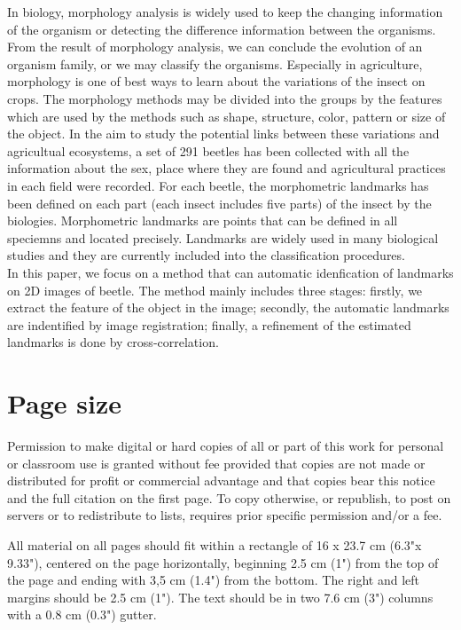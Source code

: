 \documentclass[twoside,twocolumn,10pt]{article}
\begin{document}
In biology, morphology analysis is widely used to keep the changing information of the organism or detecting the difference information between the organisms. From the result of morphology analysis, we can conclude the evolution of an organism family, or we may classify the organisms. Especially in agriculture, morphology is one of best ways to learn about the variations of the insect on crops. The morphology methods may be divided into the groups by the features which are used by the methods such as shape, structure, color, pattern or size of the object. In the aim to study the potential links between these variations and agricultual ecosystems, a set of 291 beetles has been collected with all the information about the sex, place where they are found and agricultural practices in each field were recorded. For each beetle, the morphometric landmarks has been defined on each part (each insect includes five parts) of the insect by the biologies. Morphometric landmarks are points that can be defined in all speciemns and located precisely. Landmarks are widely used in many biological studies and they are currently included into the classification procedures.\\[0.2cm]
In this paper, we focus on a method that can automatic idenfication of landmarks on 2D images of beetle. The method mainly includes three stages: firstly, we extract the feature of the object in the image; secondly, the automatic landmarks are indentified by image registration; finally, a refinement of the estimated landmarks is done by cross-correlation.

\section{Page size}
Permission to make digital or hard copies of all or part of this work for personal or classroom use is granted without fee provided that copies are not made or distributed for profit or commercial advantage and that copies bear this notice and the full citation on the first page. To copy otherwise, or republish, to post on servers or to redistribute to lists, requires prior specific permission and/or a fee. 

All material on all pages should fit within a rectangle of 16 x 23.7 cm (6.3"x 9.33"), centered on the page horizontally, beginning 2.5 cm (1") from the top of the page and ending with 3,5 cm (1.4") from the bottom.  The right and left margins should be 2.5 cm (1"). The text should be in two 7.6 cm (3") columns with a 0.8 cm (0.3") gutter. 
\end{document}
